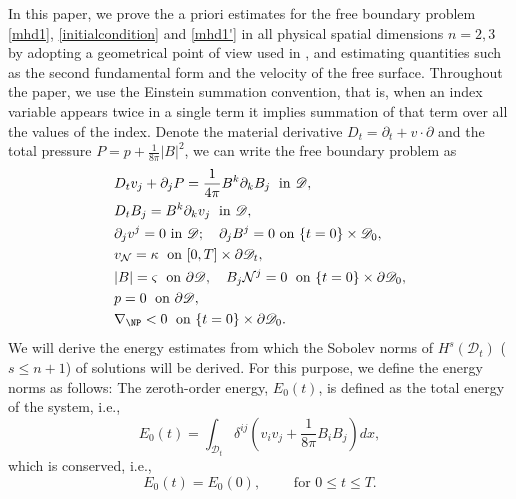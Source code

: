 \documentclass[12pt,reqno]{amsart}
\numberwithin{equation}{section}
\theoremstyle{definition}
\theoremstyle{remark}
\begin{document}
In this paper, we prove the a priori estimates for the free boundary problem \eqref{mhd1}, \eqref{initialcondition} and \eqref{mhd1'} in all physical spatial dimensions $n=2,3$ by adopting a geometrical point of view used in \cite{CL00}, and estimating quantities such as the second fundamental form and the velocity of the free surface. Throughout the paper, we use the Einstein summation convention, that is, when an index variable appears twice in a single term it implies summation of that term over all the values of the index. Denote the material derivative $D_t={\partial}_t+{v}\cdot{\partial}$ and the total pressure $P=p+\frac{1}{8\pi}|B|^2$, we can write the free boundary problem as
\begin{subequations}\label{mhd3}
\begin{align}
    &D_t v_j+{\partial}_j{P } =\frac{1}{4\pi}B^k{\partial}_k B_j\; \text{ in } {{\mathscr{D}}}, \quad \label{mhd3.1}\\
    &D_t B_j=B^k{\partial}_k v_j\; \text{ in } {{\mathscr{D}}}, \quad \label{mhd3.2}\\
    &{\partial}_jv^j=0 \text{ in } {{\mathscr{D}}}; \quad {\partial}_jB^j=0 \text{ on } \{t=0\}\times {{\mathscr{D}}}_0,\label{mhd3.3}\\
    &v_{\mathcal{N}}=\kappa\; \text{ on } [0,T]\times{\partial}{{\mathscr{D}}}_t, \label{mhd3.11}\\
    &|{B}|={\varsigma} \;\text{ on } {\partial}{{\mathscr{D}}},  \quad{B}_j {\mathcal{N}}^j=0\; \text{ on } \{t=0\}\times{\partial}{{\mathscr{D}}}_0,\label{mhd3.4}\\
    &p=0 \;\text{ on } {\partial}{{\mathscr{D}}},\label{mhd3.5}\\
    & \nabla_\NP<0 \;\text{ on } \{t=0\}\times{\partial}{{\mathscr{D}}}_0.\label{mhd3.5'}
\end{align}
\end{subequations}
We will derive the energy estimates from which the Sobolev norms of $H^s({{\mathscr{D}}}_t)$ ($s{\leqslant} n+1$) of solutions will be derived. For this purpose, we define the energy norms as follows:
The zeroth-order energy, $E_0(t)$, is defined as  the total energy of the system,  i.e.,
\begin{equation}\label{een0}
E_0(t)=\int_{{{\mathscr{D}}}_t} \delta^{ij}(v_iv_j+\frac{1}{8\pi}B_iB_j)dx,\end{equation}
which is conserved,
i.e.,
\begin{equation}\label{een0}
E_0(t)=E_0(0), \qquad \text{ for } 0{\leqslant} t{\leqslant} T.
\end{equation}
\end{document}
